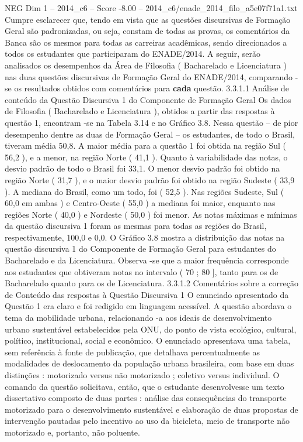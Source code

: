 \begin{textsample}{NEG Dim 1 – 2014\_c6 – Score -8.00 – 2014\_c6/enade\_2014\_filo\_a5e07f71a1.txt}
Cumpre esclarecer que, tendo em vista que as questões discursivas de Formação Geral são padronizadas, ou seja, constam de todas as provas, os comentários da Banca são os mesmos para todas as carreiras acadêmicas, sendo direcionados a todos os estudantes que participaram do ENADE/2014.
A seguir, serão analisados os desempenhos da Área de Filosofia ( Bacharelado e Licenciatura ) nas duas questões discursivas de Formação Geral do ENADE/2014, comparando -se os resultados obtidos com comentários para \textbf{cada} questão. 3.3.1.1 Análise de conteúdo da Questão Discursiva 1 do Componente de Formação Geral Os dados de Filosofia ( Bacharelado e Licenciatura ), obtidos a partir das respostas à questão 1, encontram -se na Tabela 3.14 e no Gráfico 3.8.
Nessa questão – de pior desempenho dentre as duas de Formação Geral – os estudantes, de todo o Brasil, tiveram média 50,8.
A maior média para a questão 1 foi obtida na região Sul ( 56,2 ), e a menor, na região Norte ( 41,1 ).
Quanto à variabilidade das notas, o desvio padrão de todo o Brasil foi 33,1.
O menor desvio padrão foi obtido na região Norte ( 31,7 ), e o maior desvio padrão foi obtido na região Sudeste ( 33,9 ).
A mediana do Brasil, como um todo, foi ( 52,5 ).
Nas regiões Sudeste, Sul ( 60,0 em ambas ) e Centro-Oeste ( 55,0 ) a mediana foi maior, enquanto nas regiões Norte ( 40,0 ) e Nordeste ( 50,0 ) foi menor.
As notas máximas e mínimas da questão discursiva 1 foram as mesmas para todas as regiões do Brasil, respectivamente, 100,0 e 0,0.
O Gráfico 3.8 mostra a distribuição das notas na questão discursiva 1 do Componente de Formação Geral para estudantes do Bacharelado e da Licenciatura.
Observa -se que a maior frequência corresponde aos estudantes que obtiveram notas no intervalo ( 70 ; 80 ], tanto para os de Bacharelado quanto para os de Licenciatura. 3.3.1.2 Comentários sobre a correção de Conteúdo das respostas à Questão Discursiva 1 O enunciado apresentado da Questão 1 era claro e foi redigido em linguagem acessível.
A questão abordava o tema da mobilidade urbana, relacionando -a aos ideais de desenvolvimento urbano sustentável estabelecidos pela ONU, do ponto de vista ecológico, cultural, político, institucional, social e econômico.
O enunciado apresentava uma tabela, sem referência à fonte de publicação, que detalhava percentualmente as modalidades de deslocamento da população urbana brasileira, com base em duas distinções : motorizado versus não motorizado ; coletivo versus individual.
O comando da questão solicitava, então, que o estudante desenvolvesse um texto dissertativo composto de duas partes : análise das consequências do transporte motorizado para o desenvolvimento sustentável e elaboração de duas propostas de intervenção pautadas pelo incentivo ao uso da bicicleta, meio de transporte não motorizado e, portanto, não poluente.

\end{textsample}
